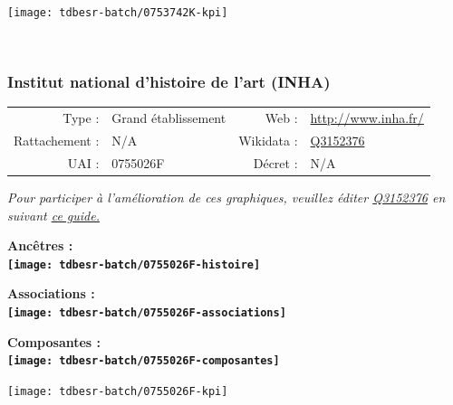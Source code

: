 \documentclass[12pt,french,]{article}
\begin{document}
\begin{center}\texttt{[image: tdbesr-batch/0753742K-kpi]} \end{center}\checkoddpage

\ifoddpage \fi ~\newpage  

\hypertarget{institut-national-dhistoire-de-lart-inha}{%
\subsubsection{Institut national d'histoire de l'art
(INHA)}\label{institut-national-dhistoire-de-lart-inha}}

\begin{tabular*}{\textwidth}{rp{5cm}rl}  
\hline  
Type : & Grand établissement & Web : &\href{http://www.inha.fr/}{http://www.inha.fr/} \\  
Rattachement : & N/A & Wikidata : & \href{https://www.wikidata.org/entity/Q3152376}{Q3152376} \\  
UAI : & 0755026F & Décret : & N/A \\  
\hline  
\end{tabular*}

\textit{\scriptsize Pour participer à l'amélioration de ces graphiques, veuillez éditer  \href{https://www.wikidata.org/entity/Q3152376}{Q3152376}  en suivant \href{https://github.com/cpesr/wikidataESR/blob/master/Rmd/wikidataESR.md}{ce guide.}}

\vspace{1cm}  
\begin{minipage}[b]{0.50\textwidth}\begin{center} \bf Ancêtres : \\  
\texttt{[image: tdbesr-batch/0755026F-histoire]} \end{center}\end{minipage}\begin{minipage}[b]{0.50\textwidth}\begin{center} \bf Associations : \\  
\texttt{[image: tdbesr-batch/0755026F-associations]} \end{center}\end{minipage}

\hrulefill

\begin{center} \bf Composantes : \\  
\texttt{[image: tdbesr-batch/0755026F-composantes]} \end{center}

\begin{center}\texttt{[image: tdbesr-batch/0755026F-kpi]} \end{center}\checkoddpage
\end{document}
